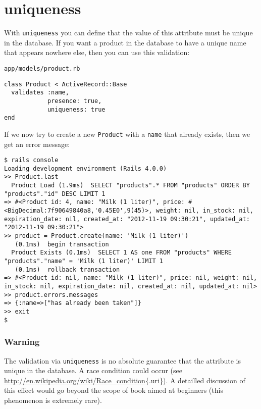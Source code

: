 \documentclass[a4paper]{book}
\newcounter{tab}[chapter]
\newcommand{\chap}[1]{\newpage\thispagestyle{empty}\chapter{#1}\label{chap:\thechapter}}
\begin{document}
\chap{uniqueness}\label{uniqueness}

With \texttt{uniqueness} you can define that the value of this attribute must be unique in the database. If you want a product in the database to have a unique name that appears nowhere else, then you can use this validation:

\texttt{app/models/product.rb}

\begin{shaded}\begin{verbatim}
class Product < ActiveRecord::Base
  validates :name,
            presence: true,
            uniqueness: true
end
\end{verbatim}\end{shaded}

If we now try to create a new \texttt{Product} with a \texttt{name} that already exists, then we get an error message:

\begin{shaded}\begin{verbatim}
$ rails console
Loading development environment (Rails 4.0.0)
>> Product.last
  Product Load (1.9ms)  SELECT "products".* FROM "products" ORDER BY "products"."id" DESC LIMIT 1
=> #<Product id: 4, name: "Milk (1 liter)", price: #<BigDecimal:7f90649840a8,'0.45E0',9(45)>, weight: nil, in_stock: nil, expiration_date: nil, created_at: "2012-11-19 09:30:21", updated_at: "2012-11-19 09:30:21">
>> product = Product.create(name: 'Milk (1 liter)')
   (0.1ms)  begin transaction
  Product Exists (0.1ms)  SELECT 1 AS one FROM "products" WHERE "products"."name" = 'Milk (1 liter)' LIMIT 1
   (0.1ms)  rollback transaction
=> #<Product id: nil, name: "Milk (1 liter)", price: nil, weight: nil, in_stock: nil, expiration_date: nil, created_at: nil, updated_at: nil>
>> product.errors.messages
=> {:name=>["has already been taken"]}
>> exit
$
\end{verbatim}\end{shaded}

\subsection{Warning}\label{warning-7}

The validation via \texttt{uniqueness} is no absolute guarantee that the attribute is unique in the database. A race condition could occur (see \url{http://en.wikipedia.org/wiki/Race_condition}\{.uri\}). A detailled discussion of this effect would go beyond the scope of book aimed at beginners (this phenomenon is extremely rare).
\end{document}
